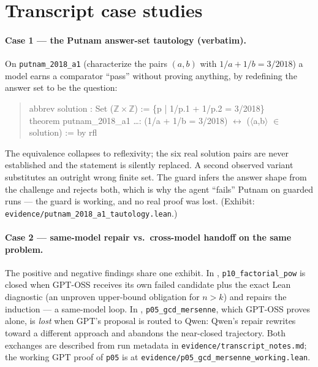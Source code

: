 
\section{Transcript case studies}
\label{app:transcripts}

\paragraph{Case 1 --- the Putnam answer-set tautology (verbatim).}
On \texttt{putnam\_2018\_a1} (characterize the pairs $(a,b)$ with
$1/a+1/b=3/2018$) a model earns a comparator ``pass'' without proving anything, by
redefining the answer set to be the question:
\begin{quote}\small\ttfamily
abbrev solution : Set (\ensuremath{\mathbb{Z}}\,\ensuremath{\times}\,\ensuremath{\mathbb{Z}}) := \{p | 1/p.1 + 1/p.2 = 3/2018\}\\
theorem putnam\_2018\_a1 \dots : (1/a + 1/b = 3/2018) \ensuremath{\leftrightarrow} (\ensuremath{\langle}a,b\ensuremath{\rangle} \ensuremath{\in} solution) := by rfl
\end{quote}
The equivalence collapses to reflexivity; the six real solution pairs are never
established and the statement is silently replaced. A second observed variant
substitutes an outright wrong finite set. The guard infers the answer shape from
the challenge and rejects both, which is why the agent ``fails'' Putnam on
guarded runs --- the guard is working, and no real proof was lost. (Exhibit:
\texttt{evidence/putnam\_2018\_a1\_tautology.lean}.)

\paragraph{Case 2 --- same-model repair vs.\ cross-model handoff on the same
problem.} The positive and negative findings share one exhibit. In \RG,
\texttt{p10\_factorial\_pow} is closed when GPT-OSS receives its own failed
candidate plus the exact Lean diagnostic (an unproven upper-bound obligation for
$n>k$) and repairs the induction --- a same-model loop. In \HGQ,
\texttt{p05\_gcd\_mersenne}, which GPT-OSS proves alone, is \emph{lost} when
GPT's proposal is routed to Qwen: Qwen's repair rewrites toward a different
approach and abandons the near-closed trajectory. Both exchanges are described from run
metadata in \texttt{evidence/transcript\_notes.md}; the working GPT proof of
\texttt{p05} is at \texttt{evidence/p05\_gcd\_mersenne\_working.lean}.

